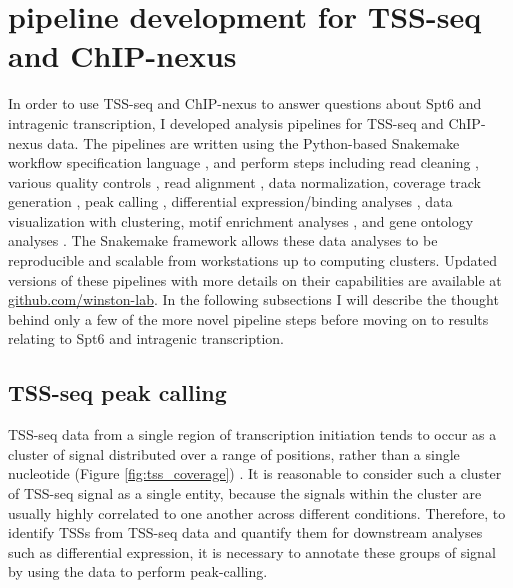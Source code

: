 \section{pipeline development for TSS-seq and ChIP-nexus}

In order to use TSS-seq and ChIP-nexus to answer questions about Spt6 and intragenic transcription, I developed analysis pipelines for TSS-seq and ChIP-nexus data.
The pipelines are written using the Python-based Snakemake workflow specification language \citep{koster2012}, and perform steps including read cleaning \citep{martin2011}, various quality controls \citep{andrews2012}, read alignment \citep{kim2013, langmead2012}, data normalization, coverage track generation \citep{quinlan2010}, peak calling \citep{zhang2008}, differential expression/binding analyses \citep{love2014}, data visualization with clustering, motif enrichment analyses \citep{bailey2015}, and gene ontology analyses \citep{young2010}.
The Snakemake framework allows these data analyses to be reproducible and scalable from workstations up to computing clusters.
Updated versions of these pipelines with more details on their capabilities are available at \href{https://github.com/winston-lab}{github.com/winston-lab}.
In the following subsections I will describe the thought behind only a few of the more novel pipeline steps before moving on to results relating to Spt6 and intragenic transcription.

\subsection{TSS-seq peak calling}

TSS-seq data from a single region of transcription initiation tends to occur as a cluster of signal distributed over a range of positions, rather than a single nucleotide (Figure \ref{fig:tss_coverage}) \citep{arribere2013, malabat2015}.
It is reasonable to consider such a cluster of TSS-seq signal as a single entity, because the signals within the cluster are usually highly correlated to one another across different conditions.
Therefore, to identify TSSs from TSS-seq data and quantify them for downstream analyses such as differential expression, it is necessary to annotate these groups of signal by using the data to perform peak-calling.

